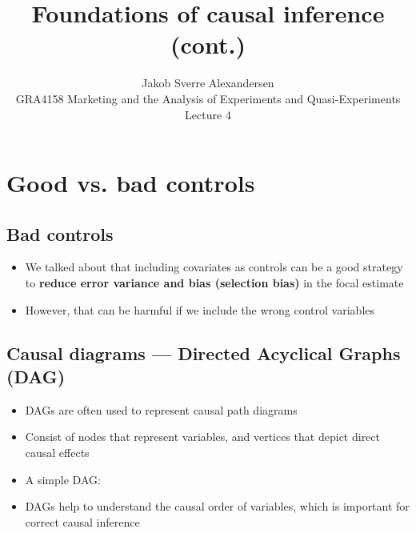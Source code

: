 \documentclass[10pt]{article}
\begin{document}
 
\title{Foundations of causal inference (cont.)}
\author{Jakob Sverre Alexandersen\\
GRA4158 Marketing and the Analysis of Experiments and Quasi-Experiments\\
Lecture 4}
\maketitle

\tableofcontents
\newpage
\section{Good vs. bad controls}
\subsection{Bad controls}
\begin{itemize}
    \item We talked about that including covariates as controls can be a good strategy to \textbf{reduce error variance and bias (selection bias)} in the focal estimate 
    \item However, that can be harmful if we include the wrong control variables
\end{itemize}
\subsection{Causal diagrams --- Directed Acyclical Graphs (DAG)}
\begin{itemize}
    \item DAGs are often used to represent causal path diagrams 
    \item Consist of nodes that represent variables, and vertices that depict direct causal effects 
    \item A simple DAG:
    \begin{center}
    \end{center}
    \item DAGs help to understand the causal order of variables, which is important for correct causal inference
\end{itemize}
\end{document}
